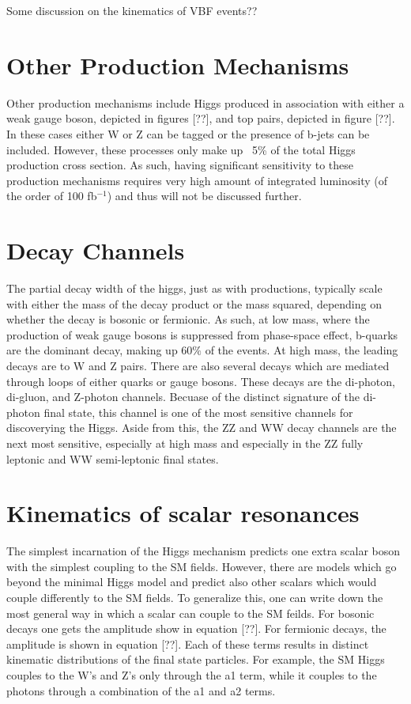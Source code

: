 Some discussion on the kinematics of VBF events??

\section{Other Production Mechanisms}
\label{sec:VHiggs}

Other production mechanisms include Higgs produced in association with either
a weak gauge boson, depicted in figures [??], and top pairs, depicted in 
figure [??].  In these cases either W or Z can be tagged or the presence of 
b-jets can be included.  However, these processes only make up ~5\% of the 
total Higgs production cross section.  As such, having significant sensitivity
to these production mechanisms requires very high amount of integrated luminosity (of the order of 100 fb$^{-1}$) and thus will not be discussed further.  

\section{Decay Channels}
\label{sec:HiggsDecays}

The partial decay width of the higgs, just as with productions, typically 
scale with either the mass of the decay product or the mass squared, 
depending on whether the decay is bosonic or fermionic.  As such, at low 
mass, where the production of weak gauge bosons is suppressed from 
phase-space effect, b-quarks are the dominant decay, making up $60\%$ of 
the events.  At high mass, the leading decays are to W and Z pairs.  There 
are also several decays which are mediated through loops of either quarks 
or gauge bosons.  These decays are the di-photon, di-gluon, and Z-photon 
channels.  Becuase of the distinct signature of the di-photon final state,
this channel is one of the most sensitive channels for discoverying the Higgs.  
Aside from this, the ZZ and WW decay channels are the next most sensitive, 
especially at high mass and especially in the ZZ fully leptonic and WW 
semi-leptonic final states. 

\section{Kinematics of scalar resonances}
\label{sec:Kinematics of scalar resonances}

The simplest incarnation of the Higgs mechanism predicts one extra scalar 
boson with the simplest coupling to the SM fields.  However, there are 
models which go beyond the minimal Higgs model and predict also other scalars
which would couple differently to the SM fields.  To generalize this, one 
can write down the most general way in which a scalar can couple to the SM
feilds.  For bosonic decays one gets the amplitude show in equation [??].  
For fermionic decays, the amplitude is shown in equation [??]. Each of these
terms results in distinct kinematic distributions of the final state particles.
For example, the SM Higgs couples to the W's and Z's only through the a1 term,
while it couples to the photons through a combination of the a1 and a2 terms.

